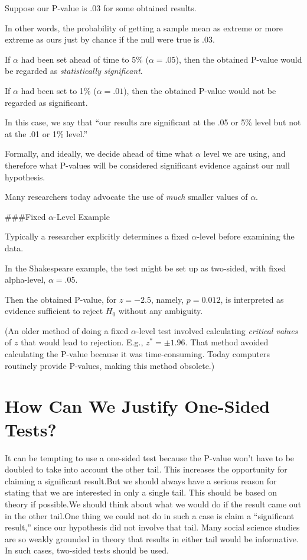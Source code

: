 \documentclass[
  letterpaper,
  DIV=11,
  numbers=noendperiod]{scrreprt}
\begin{document}
Suppose our P-value is .03 for some obtained results.

In other words, the probability of getting a sample mean as extreme or
more extreme as ours just by chance if the null were true is .03.

If \(\alpha\) had been set ahead of time to 5\% (\(\alpha = .05\)), then
the obtained P-value would be regarded as \emph{statistically
significant}.

If \(\alpha\) had been set to 1\% (\(\alpha = .01\)), then the obtained
P-value would not be regarded as significant.

In this case, we say that ``our results are significant at the .05 or
5\% level but not at the .01 or 1\% level.''

Formally, and ideally, we decide ahead of time what \(\alpha\) level we
are using, and therefore what P-values will be considered significant
evidence against our null hypothesis.

Many researchers today advocate the use of \emph{much} smaller values of
\(\alpha\).

\#\#\#Fixed \(\alpha\)-Level Example

Typically a researcher explicitly determines a fixed \(\alpha\)-level
before examining the data.

In the Shakespeare example, the test might be set up as two-sided, with
fixed alpha-level, \(\alpha = .05\).

Then the obtained P-value, for \(z = -2.5\), namely, \(p = 0.012\), is
interpreted as evidence sufficient to reject \(H_0\) without any
ambiguity.

(An older method of doing a fixed \(\alpha\)-level test involved
calculating \emph{critical values} of \(z\) that would lead to
rejection. E.g., \(z^* = \pm 1.96\). That method avoided calculating the
P-value because it was time-consuming. Today computers routinely provide
P-values, making this method obsolete.)

\section{How Can We Justify One-Sided
Tests?}\label{how-can-we-justify-one-sided-tests}

It can be tempting to use a one-sided test because the P-value won't
have to be doubled to take into account the other tail. This increases
the opportunity for claiming a significant result.But we should always
have a serious reason for stating that we are interested in only a
single tail. This should be based on theory if possible.We should think
about what we would do if the result came out in the other tail.One
thing we could not do in such a case is claim a ``significant result,''
since our hypothesis did not involve that tail. Many social science
studies are so weakly grounded in theory that results in either tail
would be informative. In such cases, two-sided tests should be used.
\end{document}
